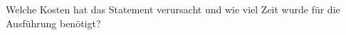     \item Welche Kosten hat das Statement verursacht und wie viel Zeit wurde für die Ausführung benötigt?
